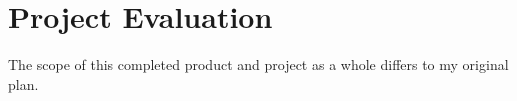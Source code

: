 \chapter{Project Evaluation}
\label{eval}

	The scope of this completed product and project as a whole differs to my original plan.









